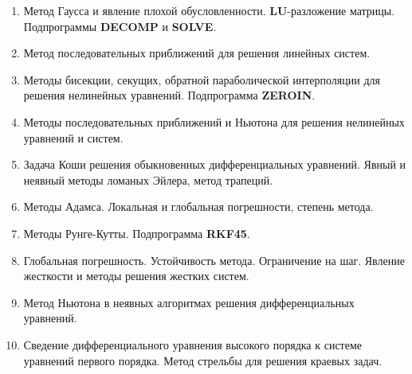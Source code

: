\documentclass[../../calc-math-exam-2023.tex]{subfiles}
\begin{document}
\begin{enumerate}
        \item Метод Гаусса и явление плохой обусловленности. \textbf{LU}-разложение матрицы. Подпрограммы \textbf{DECOMP} и \textbf{SOLVE}.
        \item Метод последовательных приближений для решения линейных систем.
        \item Методы бисекции, секущих, обратной параболической интерполяции для решения нелинейных уравнений. Подпрограмма \textbf{ZEROIN}.
        \item Методы последовательных приближений и Ньютона для решения нелинейных уравнений и систем.
        \item Задача Коши решения обыкновенных дифференциальных уравнений. Явный и неявный методы ломаных Эйлера, метод трапеций.
        \item Методы Адамса. Локальная и глобальная погрешности, степень метода.
        \item Методы Рунге-Кутты. Подпрограмма \textbf{RKF45}.
        \item Глобальная погрешность. Устойчивость метода. Ограничение на шаг. Явление жесткости и методы решения жестких систем.
        \item Метод Ньютона в неявных алгоритмах решения дифференциальных уравнений.
        \item Сведение дифференциального уравнения высокого порядка к системе уравнений первого порядка. Метод стрельбы для решения краевых задач.
    \end{enumerate}
\end{document}
